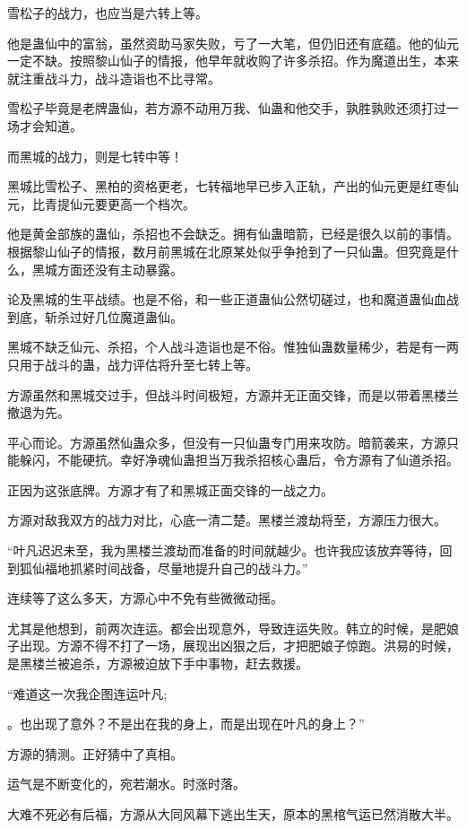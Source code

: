 \begin{this_body}
雪松子的战力，也应当是六转上等。

他是蛊仙中的富翁，虽然资助马家失败，亏了一大笔，但仍旧还有底蕴。他的仙元一定不缺。按照黎山仙子的情报，他早年就收购了许多杀招。作为魔道出生，本来就注重战斗力，战斗造诣也不比寻常。

雪松子毕竟是老牌蛊仙，若方源不动用万我、仙蛊和他交手，孰胜孰败还须打过一场才会知道。

而黑城的战力，则是七转中等！

黑城比雪松子、黑柏的资格更老，七转福地早已步入正轨，产出的仙元更是红枣仙元，比青提仙元要更高一个档次。

他是黄金部族的蛊仙，杀招也不会缺乏。拥有仙蛊暗箭，已经是很久以前的事情。根据黎山仙子的情报，数月前黑城在北原某处似乎争抢到了一只仙蛊。但究竟是什么，黑城方面还没有主动暴露。

论及黑城的生平战绩。也是不俗，和一些正道蛊仙公然切磋过，也和魔道蛊仙血战到底，斩杀过好几位魔道蛊仙。

黑城不缺乏仙元、杀招，个人战斗造诣也是不俗。惟独仙蛊数量稀少，若是有一两只用于战斗的蛊，战力评估将升至七转上等。

方源虽然和黑城交过手，但战斗时间极短，方源并无正面交锋，而是以带着黑楼兰撤退为先。

平心而论。方源虽然仙蛊众多，但没有一只仙蛊专门用来攻防。暗箭袭来，方源只能躲闪，不能硬抗。幸好净魂仙蛊担当万我杀招核心蛊后，令方源有了仙道杀招。

正因为这张底牌。方源才有了和黑城正面交锋的一战之力。

方源对敌我双方的战力对比，心底一清二楚。黑楼兰渡劫将至，方源压力很大。

“叶凡迟迟未至，我为黑楼兰渡劫而准备的时间就越少。也许我应该放弃等待，回到狐仙福地抓紧时间战备，尽量地提升自己的战斗力。”

连续等了这么多天，方源心中不免有些微微动摇。

尤其是他想到，前两次连运。都会出现意外，导致连运失败。韩立的时候，是肥娘子出现。方源不得不打了一场，展现出凶狠之后，才把肥娘子惊跑。洪易的时候，是黑楼兰被追杀，方源被迫放下手中事物，赶去救援。

“难道这一次我企图连运叶凡;

。也出现了意外？不是出在我的身上，而是出现在叶凡的身上？”

方源的猜测。正好猜中了真相。

运气是不断变化的，宛若潮水。时涨时落。

大难不死必有后福，方源从大同风幕下逃出生天，原本的黑棺气运已然消散大半。


\end{this_body}
